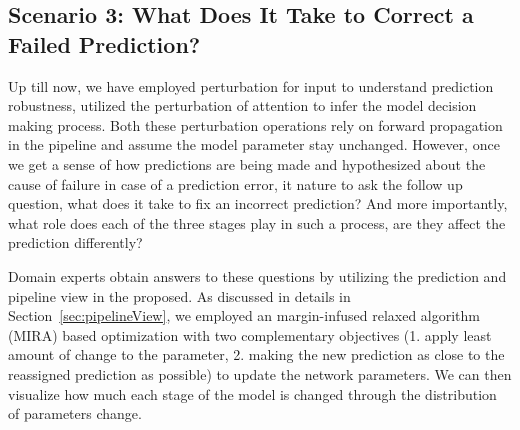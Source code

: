 





\subsection{Scenario 3: What Does It Take to Correct a Failed Prediction?}
Up till now, we have employed perturbation for input to understand prediction robustness, utilized the perturbation of attention to infer the model decision making process. Both these perturbation operations rely on forward propagation in the pipeline and assume the model parameter stay unchanged.
%
However, once we get a sense of how predictions are being made and hypothesized about the cause of failure in case of a prediction error, it nature to ask the follow up question, what does it take to fix an incorrect prediction? And more importantly, what role does each of the three stages play in such a process, are they affect the prediction differently?

Domain experts obtain answers to these questions by utilizing the prediction and pipeline view in the proposed. As discussed in details in Section~\ref{sec:pipelineView}, we employed an margin-infused relaxed algorithm (MIRA) based optimization with two complementary objectives (1. apply least amount of change to the parameter, 2. making the new prediction as close to the reassigned prediction as possible) to update the network parameters.
%
We can then visualize how much each stage of the model is changed through the distribution of parameters change.

